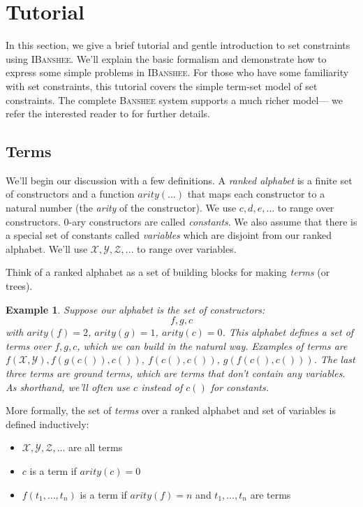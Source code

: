 \documentclass{article}
\newcommand{\banshee}{\textsc{Banshee}}
\newcommand{\ibanshee}{\textsc{IBanshee}}
\newcommand{\var}[1]{\mathcal{#1}}
\newtheorem{example}{Example}
\begin{document}
\section{Tutorial}

In this section, we give a brief tutorial and gentle introduction to
set constraints using \ibanshee{}. We'll explain the basic formalism
and demonstrate how to express some simple problems in
\ibanshee{}. For those who have some familiarity with set constraints,
this tutorial covers the simple term-set model of set constraints. The
complete \banshee{} system supports a much richer model--- we refer
the interested reader to \cite{Manuel's thesis ????} for further
details.

\subsection{Terms}

We'll begin our discussion with a few definitions. A \emph{ranked
  alphabet} is a finite set of constructors and a function
$arity(...)$ that maps each constructor to a natural number (the
\emph{arity} of the constructor). We use $c,d,e,\ldots$ to range over
constructors. $0$-ary constructors are called \emph{constants}. We
also assume that there is a special set of constants called
\emph{variables} which are disjoint from our ranked alphabet. We'll
use $\var{X}, \var{Y}, \var{Z}, \ldots$ to range over variables.

Think of a ranked alphabet as a set of building blocks for making
\emph{terms} (or trees). 

\begin{example}
Suppose our alphabet is the set of constructors:
\[
f,g,c
\]
with $arity(f) =2$, $arity(g) = 1$, $arity(c) = 0$. This alphabet
defines a set of terms over $f,g,c$, which we can build in the natural
way. Examples of terms are $f(\var{X},\var{Y}), f(g(c()),c())$,
$f(c(),c())$, $g(f(c(),c()))$. The last three terms are \emph{ground
  terms}, which are terms that don't contain any variables. As
shorthand, we'll often use $c$ instead of $c()$ for constants.
\end{example}

More formally, the set of \emph{terms} over a ranked alphabet and set
of variables is defined inductively:
\begin{itemize}
\item $\var{X},\var{Y},\var{Z},\ldots$ are all terms
\item $c$ is a term if $arity(c) = 0$
\item $f(t_1,\ldots,t_n)$ is a term if $arity(f) = n$ and
  $t_1,\ldots,t_n$ are terms
\end{itemize}
\end{document}

